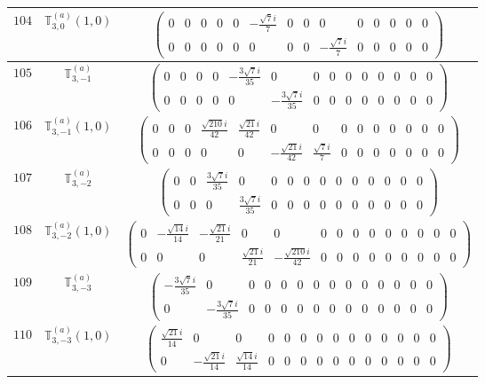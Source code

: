\documentclass[fleqn,8pt,landscape]{jsarticle}
\begin{document}
\begin{center}
\begin{longtable}{ccc}
$ 104 $ & $ \mathbb{T}_{3,0}^{(a)}(1,0) $ & $ \begin{pmatrix} 0 & 0 & 0 & 0 & 0 & - \frac{\sqrt{7} i}{7} & 0 & 0 & 0 & 0 & 0 & 0 & 0 & 0 \\ 0 & 0 & 0 & 0 & 0 & 0 & 0 & 0 & - \frac{\sqrt{7} i}{7} & 0 & 0 & 0 & 0 & 0 \end{pmatrix} $ \\ \hline
$ 105 $ & $ \mathbb{T}_{3,-1}^{(a)} $ & $ \begin{pmatrix} 0 & 0 & 0 & 0 & - \frac{3 \sqrt{7} i}{35} & 0 & 0 & 0 & 0 & 0 & 0 & 0 & 0 & 0 \\ 0 & 0 & 0 & 0 & 0 & - \frac{3 \sqrt{7} i}{35} & 0 & 0 & 0 & 0 & 0 & 0 & 0 & 0 \end{pmatrix} $ \\ \hline
$ 106 $ & $ \mathbb{T}_{3,-1}^{(a)}(1,0) $ & $ \begin{pmatrix} 0 & 0 & 0 & \frac{\sqrt{210} i}{42} & \frac{\sqrt{21} i}{42} & 0 & 0 & 0 & 0 & 0 & 0 & 0 & 0 & 0 \\ 0 & 0 & 0 & 0 & 0 & - \frac{\sqrt{21} i}{42} & \frac{\sqrt{7} i}{7} & 0 & 0 & 0 & 0 & 0 & 0 & 0 \end{pmatrix} $ \\ \hline
$ 107 $ & $ \mathbb{T}_{3,-2}^{(a)} $ & $ \begin{pmatrix} 0 & 0 & \frac{3 \sqrt{7} i}{35} & 0 & 0 & 0 & 0 & 0 & 0 & 0 & 0 & 0 & 0 & 0 \\ 0 & 0 & 0 & \frac{3 \sqrt{7} i}{35} & 0 & 0 & 0 & 0 & 0 & 0 & 0 & 0 & 0 & 0 \end{pmatrix} $ \\ \hline
$ 108 $ & $ \mathbb{T}_{3,-2}^{(a)}(1,0) $ & $ \begin{pmatrix} 0 & - \frac{\sqrt{14} i}{14} & - \frac{\sqrt{21} i}{21} & 0 & 0 & 0 & 0 & 0 & 0 & 0 & 0 & 0 & 0 & 0 \\ 0 & 0 & 0 & \frac{\sqrt{21} i}{21} & - \frac{\sqrt{210} i}{42} & 0 & 0 & 0 & 0 & 0 & 0 & 0 & 0 & 0 \end{pmatrix} $ \\ \hline
$ 109 $ & $ \mathbb{T}_{3,-3}^{(a)} $ & $ \begin{pmatrix} - \frac{3 \sqrt{7} i}{35} & 0 & 0 & 0 & 0 & 0 & 0 & 0 & 0 & 0 & 0 & 0 & 0 & 0 \\ 0 & - \frac{3 \sqrt{7} i}{35} & 0 & 0 & 0 & 0 & 0 & 0 & 0 & 0 & 0 & 0 & 0 & 0 \end{pmatrix} $ \\ \hline
$ 110 $ & $ \mathbb{T}_{3,-3}^{(a)}(1,0) $ & $ \begin{pmatrix} \frac{\sqrt{21} i}{14} & 0 & 0 & 0 & 0 & 0 & 0 & 0 & 0 & 0 & 0 & 0 & 0 & 0 \\ 0 & - \frac{\sqrt{21} i}{14} & \frac{\sqrt{14} i}{14} & 0 & 0 & 0 & 0 & 0 & 0 & 0 & 0 & 0 & 0 & 0 \end{pmatrix} $ \\ \hline

\end{longtable}
\end{center}
\end{document}
